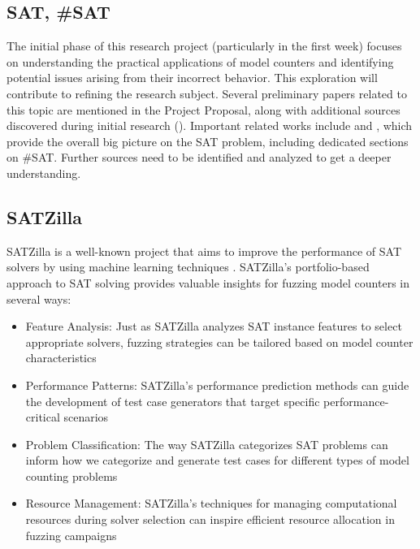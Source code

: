 \documentclass[english, a4paper]{article}
\begin{document}
\subsection*{SAT, \#SAT}

The initial phase of this research project (particularly in the first week) focuses on understanding the practical applications of model counters and identifying potential issues arising from their incorrect behavior. This exploration will contribute to refining the research subject. Several preliminary papers related to this topic are mentioned in the Project Proposal, along with additional sources discovered during initial research (\textcite{Shaw2024}). Important related works include \textcite{Biere2009} and \textcite{Kullmann2009}, which provide the overall big picture on the SAT problem, including dedicated sections on \#SAT. Further sources need to be identified and analyzed to get a deeper understanding.

\subsection*{SATZilla}

SATZilla is a well-known project that aims to improve the performance of SAT solvers by using machine learning techniques \parencite{Xu2008}. SATZilla's portfolio-based approach to SAT solving provides valuable insights for fuzzing model counters in several ways:

\begin{itemize}
    \item Feature Analysis: Just as SATZilla analyzes SAT instance features to select appropriate solvers, fuzzing strategies can be tailored based on model counter characteristics
    
    \item Performance Patterns: SATZilla's performance prediction methods can guide the development of test case generators that target specific performance-critical scenarios
    
    \item Problem Classification: The way SATZilla categorizes SAT problems can inform how we categorize and generate test cases for different types of model counting problems
    
    \item Resource Management: SATZilla's techniques for managing computational resources during solver selection can inspire efficient resource allocation in fuzzing campaigns
\end{itemize}
\end{document}
